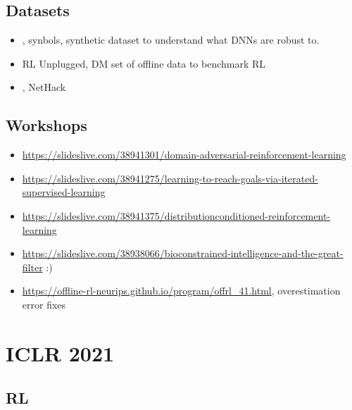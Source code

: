 \subsection{Datasets}
\begin{itemize}
\item \citet{lacoste2020synbols}, synbols, synthetic dataset to understand what DNNs are robust to.
\item RL Unplugged, DM set of offline data to benchmark RL
  \item \citet{kuttler2020nethack}, NetHack 
  \end{itemize}

\subsection{Workshops}

\begin{itemize}
\item \url{https://slideslive.com/38941301/domain-adversarial-reinforcement-learning}
\item \url{https://slideslive.com/38941275/learning-to-reach-goals-via-iterated-supervised-learning}
\item \url{https://slideslive.com/38941375/distributionconditioned-reinforcement-learning}
\item \url{https://slideslive.com/38938066/bioconstrained-intelligence-and-the-great-filter} :)
\item \url{https://offline-rl-neurips.github.io/program/offrl_41.html}, overestimation error fixes
\end{itemize}


\section{ICLR 2021}

\subsection{RL}

